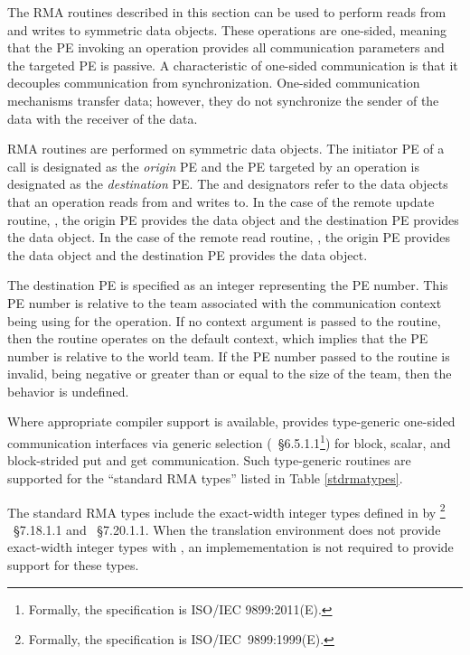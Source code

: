 The \ac{RMA} routines described in this section can be used to perform
reads from and writes to symmetric data objects. These operations
are one-sided, meaning that the \ac{PE} invoking an operation provides all
communication parameters and the targeted \ac{PE} is passive. A characteristic
of one-sided communication is that it decouples communication from
synchronization. One-sided communication mechanisms transfer data; however,
they do not synchronize the sender of the data with the receiver of the data.

\openshmem \ac{RMA} routines are performed on symmetric data objects.  The
initiator \ac{PE} of a call is designated as the \emph{origin} \ac{PE} and the
\ac{PE} targeted by an operation is designated as the \emph{destination} \ac{PE}.  The
\source{} and \dest{} designators refer to the data objects that an operation
reads from and writes to.  In the case of the remote update routine, \PUT{},
the origin \ac{PE} provides the \source{} data object and the destination
\ac{PE} provides the \dest{} data object. In the case of the remote read
routine, \GET{}, the origin \ac{PE} provides the \dest{} data object and the
destination \ac{PE} provides the \source{} data object.

The destination \ac{PE} is specified as an integer representing the \ac{PE} number.
This \ac{PE} number is relative to the team associated with the
communication context being using for the operation. If no context argument is passed to the routine,
then the routine operates on the default context, which implies that
the \ac{PE} number is relative to the world team.
If the \ac{PE} number passed to the routine is invalid, being negative
or greater than or equal to the size of the \openshmem team, then the behavior is undefined.

Where appropriate compiler support is available, \openshmem provides type-generic 
one-sided communication interfaces via \Cstd[11] generic selection
(\Cstd[11]~\S6.5.1.1\footnote{Formally, the \Cstd[11] specification is ISO/IEC 9899:2011(E).})
for block, scalar, and block-strided put and get communication. 
Such type-generic routines are supported for the ``standard \ac{RMA} types''
listed in Table \ref{stdrmatypes}.

The standard \ac{RMA} types include the exact-width integer types defined in
 by \Cstd[99]%
\footnote{Formally, the \Cstd[99] specification is ISO/IEC~9899:1999(E).}%
~\S7.18.1.1 and \Cstd[11]~\S7.20.1.1. When the \Cstd translation environment
does not provide exact-width integer types with , an
\openshmem implemementation is not required to provide support for these types.

